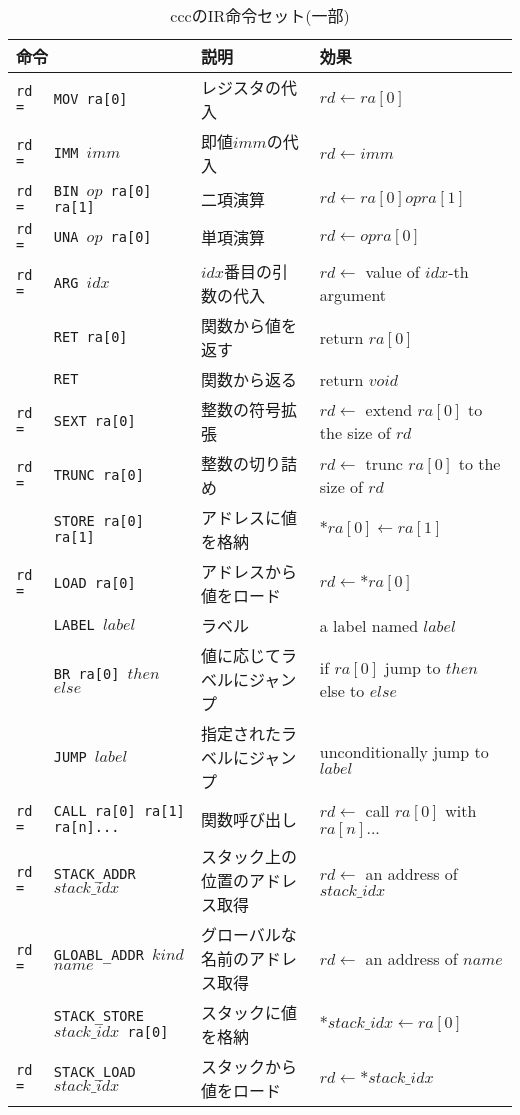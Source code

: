 \documentclass[../main.tex]{subfiles}
\begin{document}
\begin{table}[hp]
  \centering
  \begin{tabular}{llll}
    \multicolumn{2}{l}{命令} & 説明 & 効果 \\ \hline\hline
    \texttt{rd =}&\texttt{MOV ra[0]} & レジスタの代入 & $rd \gets ra[0]$ \\
    \texttt{rd =}&\texttt{IMM $imm$} & 即値$imm$の代入 & $rd \gets imm$ \\
    \texttt{rd =}&\texttt{BIN $op$ ra[0] ra[1]} & 二項演算 & $rd \gets ra[0] \mathbin{op} ra[1]$ \\
    \texttt{rd =}&\texttt{UNA $op$ ra[0]} & 単項演算 & $rd \gets \mathrel{op} ra[0]$ \\
    \texttt{rd =}&\texttt{ARG $idx$} & $idx$番目の引数の代入 & $rd \gets $ value of $idx$-th argument \\
    &\texttt{RET ra[0]} & 関数から値を返す & return $ra[0]$ \\
    &\texttt{RET} & 関数から返る & return $void$ \\
    \texttt{rd =}&\texttt{SEXT ra[0]} & 整数の符号拡張 & $rd \gets$ extend $ra[0]$ to the size of $rd$ \\
    \texttt{rd =}&\texttt{TRUNC ra[0]} & 整数の切り詰め & $rd \gets$ trunc $ra[0]$ to the size of $rd$ \\
    &\texttt{STORE ra[0] ra[1]} & アドレスに値を格納 & $*ra[0] \gets ra[1]$ \\
    \texttt{rd =}&\texttt{LOAD ra[0]} & アドレスから値をロード & $rd \gets *ra[0]$ \\
    &\texttt{LABEL $label$} & ラベル & a label named $label$ \\
    &\texttt{BR ra[0] $then$ $else$} & 値に応じてラベルにジャンプ & if $ra[0]$ jump to $then$ else to $else$ \\
    &\texttt{JUMP $label$} & 指定されたラベルにジャンプ & unconditionally jump to $label$ \\
    \texttt{rd =}&\texttt{CALL ra[0] ra[1] ra[n]...} & 関数呼び出し & $rd \gets$ call $ra[0]$ with $ra[n]...$ \\
    \texttt{rd =}&\texttt{STACK\_ADDR $stack\_idx$} & スタック上の位置のアドレス取得 & $rd \gets $ an address of $stack\_idx$ \\
    \texttt{rd =}&\texttt{GLOABL\_ADDR $kind$ $name$} & グローバルな名前のアドレス取得 & $rd \gets $ an address of $name$ \\
    &\texttt{STACK\_STORE $stack\_idx$ ra[0]} & スタックに値を格納 & $*stack\_idx \gets ra[0]$ \\
    \texttt{rd =}&\texttt{STACK\_LOAD $stack\_idx$} & スタックから値をロード & $rd \gets *stack\_idx$
  \end{tabular}
  \caption{cccのIR命令セット(一部)}
  \label{tb:ccc_isa}
\end{table}
\end{document}
